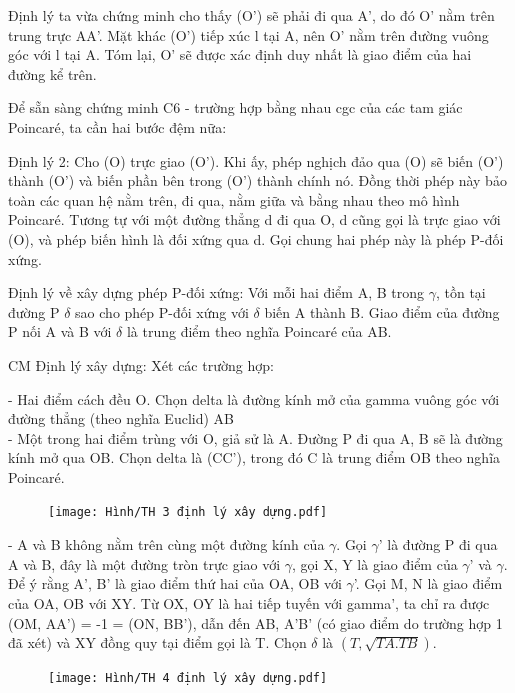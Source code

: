 \begin{multicols}{2}
	Định lý ta vừa chứng minh cho thấy (O’) sẽ phải đi qua A’, do đó O’ nằm trên trung trực AA’. Mặt khác (O’) tiếp xúc l tại A, nên O’ nằm trên đường vuông góc với l tại A. Tóm lại, O’ sẽ được xác định duy nhất là giao điểm của hai đường kể trên.
	
	Để sẵn sàng chứng minh C6 - trường hợp bằng nhau cgc của các tam giác Poincaré, ta cần hai bước đệm nữa:
	
	Định lý 2: Cho (O) trực giao (O’). Khi ấy, phép nghịch đảo qua (O) sẽ biến (O’) thành (O’) và biến phần bên trong (O’) thành chính nó. Đồng thời phép này bảo toàn các quan hệ nằm trên, đi qua, nằm giữa và bằng nhau theo mô hình Poincaré. Tương tự với một đường thẳng d đi qua O,  d cũng gọi là trực giao với (O), và phép biến hình là đối xứng qua d. Gọi chung hai phép này là phép P-đối xứng.
	
	Định lý về xây dựng phép P-đối xứng: Với mỗi hai điểm A, B trong $\gamma$, tồn tại đường P $\delta$ sao cho phép P-đối xứng với $\delta$ biến A thành B. Giao điểm của đường P nối A và B với $\delta$ là trung điểm theo nghĩa Poincaré của AB.
	
	
	
	CM Định lý xây dựng: Xét các trường hợp:
	
	- Hai điểm cách đều O. Chọn delta là đường kính mở của gamma vuông góc với đường thẳng (theo nghĩa Euclid) AB \\
	- Một trong hai điểm trùng với O, giả sử là A. Đường P đi qua A, B sẽ là đường kính mở qua OB. Chọn delta là (CC’), trong đó C là trung điểm OB theo nghĩa Poincaré. \\
	
	\begin{figure}[ht]
		\texttt{[image: Hình/TH 3 định lý xây dựng.pdf]}
	\end{figure}
	
	- A và B không nằm trên cùng một đường kính của $\gamma$. Gọi $\gamma$’ là đường P đi qua A và B, đây là một đường tròn trực giao với $\gamma$, gọi X, Y là giao điểm của $\gamma$’ và $\gamma$. Để ý rằng A’, B’ là giao điểm thứ hai của OA, OB với $\gamma$’. Gọi M, N là giao điểm của OA, OB với XY. Từ OX, OY là hai tiếp tuyến với gamma’, ta chỉ ra được (OM, AA’) = -1 = (ON, BB’), dẫn đến AB, A’B’ (có giao điểm do trường hợp 1 đã xét) và XY đồng quy tại điểm gọi là T. Chọn $\delta$ là $(T, \sqrt{TA.TB})$. \\
	
	\begin{figure}[ht]
		\texttt{[image: Hình/TH 4 định lý xây dựng.pdf]}
	\end{figure}
	

\end{multicols}
